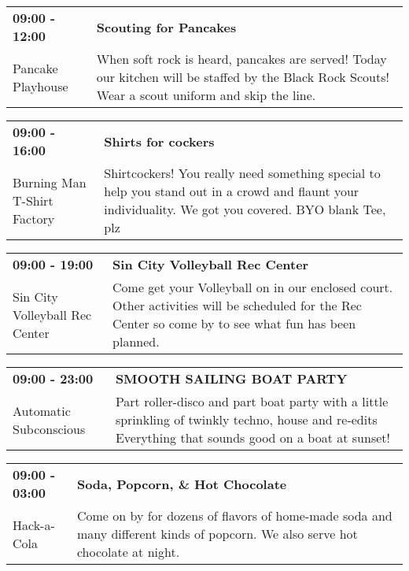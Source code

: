 \begin{tabular}{ p{1in} p{2.2in} }
    \textbf{09:00 - 12:00} & \textbf{Scouting for Pancakes} \\
    Pancake Playhouse \newline  & When soft rock is heard, pancakes are served!  Today our kitchen will be staffed by the Black Rock Scouts!  Wear a scout uniform and skip the line. \\
    \hline 
\end{tabular}
    
\begin{tabular}{ p{1in} p{2.2in} }
    \textbf{09:00 - 16:00} & \textbf{Shirts for cockers} \\
    Burning Man T-Shirt Factory \newline  & Shirtcockers! You really need something special to help you stand out in a crowd and flaunt your individuality. We got you covered. BYO blank Tee, plz \\
    \hline 
\end{tabular}
    
\begin{tabular}{ p{1in} p{2.2in} }
    \textbf{09:00 - 19:00} & \textbf{Sin City Volleyball Rec Center} \\
    Sin City Volleyball Rec Center \newline  & Come get your Volleyball on in our enclosed court. Other activities will be scheduled for the Rec Center so come by to see what fun has been planned. \\
    \hline 
\end{tabular}
    
\begin{tabular}{ p{1in} p{2.2in} }
    \textbf{09:00 - 23:00} & \textbf{SMOOTH SAILING BOAT PARTY} \\
    Automatic Subconscious \newline  & Part roller-disco and part boat party with a little sprinkling of twinkly techno, house and re-edits Everything that sounds good on a boat at sunset! \\
    \hline 
\end{tabular}
    
\begin{tabular}{ p{1in} p{2.2in} }
    \textbf{09:00 - 03:00} & \textbf{Soda, Popcorn, \& Hot Chocolate} \\
    Hack-a-Cola \newline  & Come on by for dozens of flavors of home-made soda and many different kinds of popcorn. We also serve hot chocolate at night. \\
    \hline 
\end{tabular}
    
